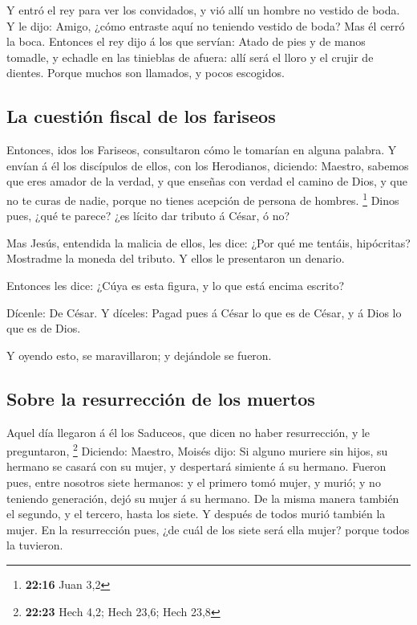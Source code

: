  Y entró el rey para ver los convidados, y vió allí un
hombre no vestido de boda.  Y le dijo: Amigo, ¿cómo
entraste aquí no teniendo vestido de boda? Mas él cerró la boca.
 Entonces el rey dijo á los que servían: Atado de pies y de
manos tomadle, y echadle en las tinieblas de afuera: allí será el lloro
y el crujir de dientes.  Porque muchos son llamados, y
pocos escogidos.

\hypertarget{la-cuestiuxf3n-fiscal-de-los-fariseos}{%
\subsection{La cuestión fiscal de los
fariseos}\label{la-cuestiuxf3n-fiscal-de-los-fariseos}}

 Entonces, idos los Fariseos, consultaron cómo le tomarían
en alguna palabra.  Y envían á él los discípulos de ellos,
con los Herodianos, diciendo: Maestro, sabemos que eres amador de la
verdad, y que enseñas con verdad el camino de Dios, y que no te curas de
nadie, porque no tienes acepción de persona de hombres. \footnote{\textbf{22:16}
  Juan 3,2}  Dinos pues, ¿qué te parece? ¿es lícito dar
tributo á César, ó no?

 Mas Jesús, entendida la malicia de ellos, les dice: ¿Por
qué me tentáis, hipócritas?  Mostradme la moneda del
tributo. Y ellos le presentaron un denario.

 Entonces les dice: ¿Cúya es esta figura, y lo que está
encima escrito?

 Dícenle: De César. Y díceles: Pagad pues á César lo que es
de César, y á Dios lo que es de Dios.

 Y oyendo esto, se maravillaron; y dejándole se fueron.

\hypertarget{sobre-la-resurrecciuxf3n-de-los-muertos}{%
\subsection{Sobre la resurrección de los
muertos}\label{sobre-la-resurrecciuxf3n-de-los-muertos}}

 Aquel día llegaron á él los Saduceos, que dicen no haber
resurrección, y le preguntaron, \footnote{\textbf{22:23} Hech 4,2; Hech
  23,6; Hech 23,8}  Diciendo: Maestro, Moisés dijo: Si
alguno muriere sin hijos, su hermano se casará con su mujer, y
despertará simiente á su hermano.  Fueron pues, entre
nosotros siete hermanos: y el primero tomó mujer, y murió; y no teniendo
generación, dejó su mujer á su hermano.  De la misma manera
también el segundo, y el tercero, hasta los siete.  Y
después de todos murió también la mujer.  En la
resurrección pues, ¿de cuál de los siete será ella mujer? porque todos
la tuvieron.

